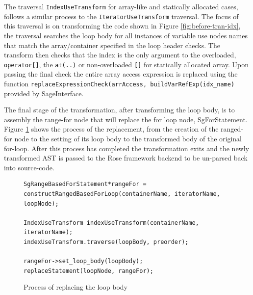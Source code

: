 \documentclass[bsc,frontabs,singlespacing,twoside,parskip,deptreport]{infthesis}
\begin{document}
The traversal \texttt{IndexUseTransform} for array-like and statically allocated cases, follows a similar process to the \texttt{IteratorUseTransform} traversal. The focus of this traversal is on transforming the code shown in Figure \ref{fig:before-tran-idx}, the traversal searches the loop body for all instances of variable use nodes names that match the array/container specified in the loop header checks. The transform then checks that the index is the only argument to the overloaded, \texttt{operator[]}, the \texttt{at(..)} or non-overloaded \texttt{[]} for statically allocated array. Upon passing the final check the entire array access expression  is replaced using the function \texttt{replaceExpressionCheck(arrAccess, buildVarRefExp(idx\_name)} provided by SageInterface.

The final stage of the transformation, after transforming the loop body, is to assembly the range-for node that will replace the for loop node, SgForStatement. Figure \ref{fig:replacing-for-loop-node} shows the process of the replacement, from the creation of the ranged-for node to the setting of its loop body to the transformed body of the original for-loop. After this process has completed the transformation exits and the newly transformed AST is passed to the Rose framework backend to be un-parsed back into source-code.

\begin{figure}[H]
    \centering
    \begin{verbatim}
SgRangeBasedForStatement*rangeFor =
constructRangedBasedForLoop(containerName, iteratorName, loopNode);

IndexUseTransform indexUseTransform(containerName, iteratorName);
indexUseTransform.traverse(loopBody, preorder);

rangeFor->set_loop_body(loopBody);
replaceStatement(loopNode, rangeFor);
    \end{verbatim}
    \caption{Process of replacing the loop body}
    \label{fig:replacing-for-loop-node}
\end{figure}

\end{document}
